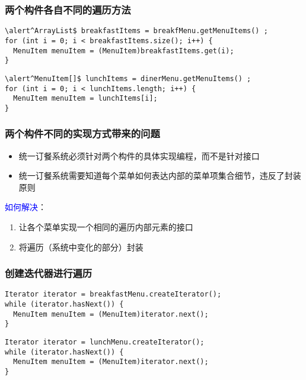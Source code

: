 \documentclass[compress]{beamer}
\newcommand{\textblue}[1]{\textcolor{blue}{#1}}
\begin{document}
\begin{frame}[fragile]
  \frametitle{两个构件各自不同的遍历方法}
\begin{Verbatim}[label=早餐项遍历需要使用ArrayList的size和get方法, 
  commandchars=\\\^\$]
\alert^ArrayList$ breakfastItems = breakfMenu.getMenuItems() ;
for (int i = 0; i < breakfastItems.size(); i++) {
  MenuItem menuItem = (MenuItem)breakfastItems.get(i); 
}
\end{Verbatim}

\vspace*{3ex}

\begin{Verbatim}[label=午餐项遍历需要使用数组的length字段和下标操作, 
  commandchars=\\\^\$]
\alert^MenuItem[]$ lunchItems = dinerMenu.getMenuItems() ;
for (int i = 0; i < lunchItems.length; i++) {
  MenuItem menuItem = lunchItems[i]; 
}
\end{Verbatim}
\end{frame}

\begin{frame}
\frametitle{两个构件不同的实现方式带来的问题}

\begin{itemize}
\item 统一订餐系统必须针对两个构件的具体实现编程，而不是针对接口
\item 统一订餐系统需要知道每个菜单如何表达内部的菜单项集合细节，违反了封装原则
\end{itemize}

  \textblue{如何解决}：
\begin{enumerate}
\item 让各个菜单实现一个相同的遍历内部元素的接口 
  \item 将遍历（系统中变化的部分）封装
\end{enumerate}
\end{frame}

\begin{frame}[fragile]
  \frametitle{创建迭代器进行遍历}
\begin{Verbatim}[label=遍历ArrayList] 
Iterator iterator = breakfastMenu.createIterator(); 
while (iterator.hasNext()) {
  MenuItem menuItem = (MenuItem)iterator.next();
}
\end{Verbatim}
\vspace*{3ex}
\begin{Verbatim}[label=遍历数组] 
Iterator iterator = lunchMenu.createIterator();
while (iterator.hasNext()) {
  MenuItem menuItem = (MenuItem)iterator.next(); 
}
\end{Verbatim}

\end{frame}
\end{document}
